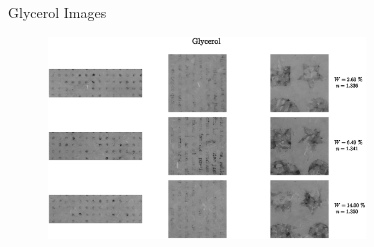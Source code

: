 \documentclass[10pt]{beamer}
\begin{document}
\begin{frame}{Glycerol Images}
\begin{figure}
    \centering
    \includegraphics[width = 0.75\textwidth]{figs/Gly_Imgs.eps}
    \label{ex_shapes}
\end{figure}
    
\end{frame}
\end{document}
